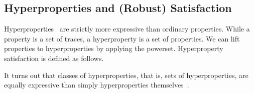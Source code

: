 \subsection{Hyperproperties and (Robust) Satisfaction}

Hyperproperties~\cite{clarkson2008hyper} are strictly more expressive than ordinary properties. 
While a property is a set of traces, a hyperproperty is a set of properties. 
We can lift properties to hyperproperties by applying the powerset.
Hyperproperty satisfaction is defined as follows.

It turns out that classes of hyperproperties, that is, sets of hyperproperties, are equally expressive than simply hyperproperties themselves~\cite{clarkson2008hyper}.


